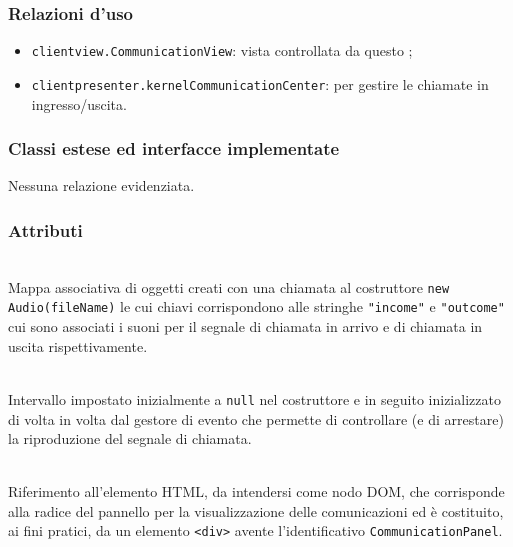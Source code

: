 \subsubsection*{Relazioni d'uso}
\begin{itemize}
  \item \texttt{clientview.CommunicationView}: vista controllata da questo ;
  \item \texttt{clientpresenter.kernelCommunicationCenter}: per gestire le chiamate in ingresso/uscita.
\end{itemize}

\subsubsection*{Classi estese ed interfacce implementate}
Nessuna relazione evidenziata.

\subsubsection*{Attributi}
\begin{description}

  \item{}\\
  Mappa associativa di oggetti creati con una chiamata al costruttore \verb'new Audio(fileName)' le cui chiavi corrispondono alle stringhe \verb'"income"' e \verb'"outcome"' cui sono associati i suoni per il segnale di chiamata in arrivo e di chiamata in uscita rispettivamente.
  
  \item{}\\
  Intervallo impostato inizialmente a \verb'null' nel costruttore e in seguito inizializzato di volta in volta dal gestore di evento  che permette di controllare (e di arrestare) la riproduzione del segnale di chiamata.
  
\item{}\\
Riferimento all'elemento HTML, da intendersi come nodo DOM, che corrisponde alla radice del pannello per la visualizzazione delle comunicazioni ed è costituito, ai fini pratici, da un elemento \verb'<div>' avente l'identificativo \verb'CommunicationPanel'.

\end{description}

